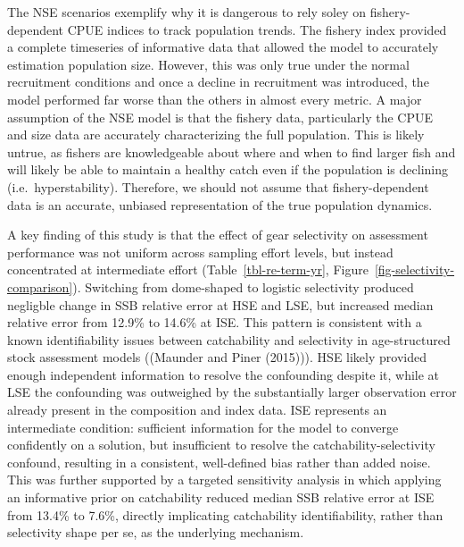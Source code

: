 \documentclass[
  letterpaper,
  12pt,
  letterpaper]{report}
\begin{document}
The NSE scenarios exemplify why it is dangerous to rely soley on
fishery-dependent CPUE indices to track population trends. The fishery
index provided a complete timeseries of informative data that allowed
the model to accurately estimation population size. However, this was
only true under the normal recruitment conditions and once a decline in
recruitment was introduced, the model performed far worse than the
others in almost every metric. A major assumption of the NSE model is
that the fishery data, particularly the CPUE and size data are
accurately characterizing the full population. This is likely untrue, as
fishers are knowledgeable about where and when to find larger fish and
will likely be able to maintain a healthy catch even if the population
is declining (i.e.~hyperstability). Therefore, we should not assume that
fishery-dependent data is an accurate, unbiased representation of the
true population dynamics.

A key finding of this study is that the effect of gear selectivity on
assessment performance was not uniform across sampling effort levels,
but instead concentrated at intermediate effort
(Table~\ref{tbl-re-term-yr}, Figure~\ref{fig-selectivity-comparison}).
Switching from dome-shaped to logistic selectivity produced negligble
change in SSB relative error at HSE and LSE, but increased median
relative error from 12.9\% to 14.6\% at ISE. This pattern is consistent
with a known identifiability issues between catchability and selectivity
in age-structured stock assessment models ((Maunder and Piner (2015))).
HSE likely provided enough independent information to resolve the
confounding despite it, while at LSE the confounding was outweighed by
the substantially larger observation error already present in the
composition and index data. ISE represents an intermediate condition:
sufficient information for the model to converge confidently on a
solution, but insufficient to resolve the catchability-selectivity
confound, resulting in a consistent, well-defined bias rather than added
noise. This was further supported by a targeted sensitivity analysis in
which applying an informative prior on catchability reduced median SSB
relative error at ISE from 13.4\% to 7.6\%, directly implicating
catchability identifiability, rather than selectivity shape per se, as
the underlying mechanism.
\end{document}
